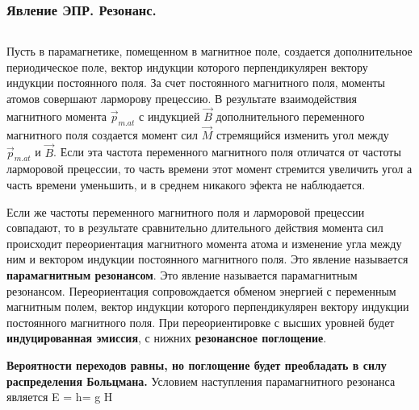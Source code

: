 \documentclass{beamer}
\begin{document}
\begin{frame}[r]
\frametitle{Явление ЭПР. Резонанс.}
\begin{columns}[t]
\begin{column}{1\linewidth}
\begin{block}{}
\scriptsize {
Пусть в парамагнетике, помещенном в магнитное поле, создается дополнительное периодическое поле, вектор индукции которого перпендикулярен вектору индукции постоянного поля. За счет постоянного магнитного поля, моменты атомов совершают ларморову прецессию. В результате взаимодействия магнитного момента $\vec{p}_{m.at}$ с индукцией $\vec{B}$ дополнительного переменного магнитного поля создается момент сил $\vec{M}$ стремящийся изменить угол между $\vec{p}_{m.at}$ и $\vec{B}$. Если эта частота переменного магнитного поля отличатся от частоты ларморовой прецессии, то часть времени этот момент стремится увеличить угол а часть времени уменьшить, и в среднем никакого эфекта не наблюдается.

Если же частоты переменного магнитного поля и ларморовой прецессии совпадают, то в результате сравнительно длительного действия момента сил происходит переориентация магнитного момента атома и изменение угла между ним и вектором индукции постоянного магнитного поля. Это явление называется \textbf{парамагнитным резонансом}. Это явление называется парамагнитным резонансом. Переориентация сопровождается обменом энергией с переменным магнитным полем, вектор индукции которого перпендикулярен вектору индукции постоянного магнитного поля. При переориентировке с высших уровней будет \textbf{индуцированная эмиссия}, с нижних\textbf{ резонансное поглощение}.

\textbf{Вероятности переходов равны, но поглощение будет преобладать в силу распределения Больцмана.} Условием наступления парамагнитного резонанса является
\beqn
\Delta E = h\nu  = g \beta H
\eeq
}
\end{block}
\end{column}
\end{columns}
\end{frame}

\end{document}
